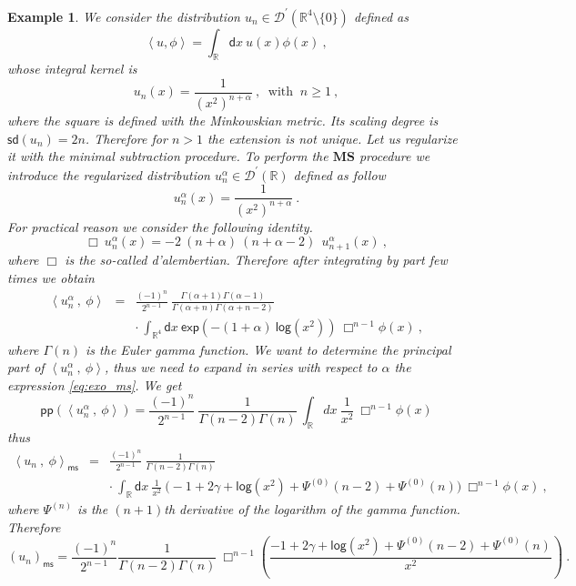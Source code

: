 \documentclass[11pt]{book}
\newcommand{\pp}{\mathsf{pp}}
\newcommand{\ms}{\mathsf{ms}}
\newcommand{\sd}{\mathsf{sd}}
\newcommand{\MS}{\textbf{MS}}
\renewcommand{\exp}{\mathsf{exp}}
\renewcommand{\log}{\mathsf{log}}
\newcommand{\sm}[1]{\left\langle#1\right\rangle}
\newcommand{\Dcal}{\mathcal{D}}
\newcommand{\Rbb}{\mathbb{R}}
\newcommand{\dsf}{\mathsf{d}}
\theoremstyle{break}
\newtheorem{example}{Example}[chapter]
\begin{document}
\begin{example}\label{exo:ms_numeric}
We consider the distribution $u_n \in \Dcal^\prime(\Rbb^4\setminus\{0\})$ defined as 
%
\begin{equation*}
\sm{u, \phi} = \int_{\Rbb} \dsf x \ u(x) \phi(x)  \ ,
\end{equation*}
%
whose integral kernel is 
%
\begin{equation*}
u_n(x) = \frac{1}{(x^2)^{n+\alpha}} \ , \ \mbox{ with } \ n \geq 1 \ ,
\end{equation*}
%
where the square is defined with the Minkowskian metric. Its scaling degree is $\sd(u_n)=2n$. Therefore for $n>1$ the extension is not unique. Let us regularize it with the minimal subtraction procedure. To perform the $\MS$ procedure we introduce the regularized distribution $u^\alpha_n \in \Dcal^\prime(\Rbb)$ defined as follow
%
\begin{equation*}
u^\alpha_n(x) = \frac{1}{(x^2)^{n+\alpha}} \ .
\end{equation*}
%
For practical reason we consider the following identity. 
%
\begin{equation*}
\Box \ u^\alpha_n(x) = - 2 \ (n+\alpha) \ (n+\alpha-2) \ \ u^\alpha_{n+1}(x)  \ , 
\label{eq:relation_exo_ms}
\end{equation*}
%
where $\Box$ is the so-called d'alembertian. Therefore after integrating by part few times we obtain
%
\begin{eqnarray}
\sm{u^\alpha_n \ , \ \phi} &=& \frac{(-1)^{n}}{2^{n-1}} \ \frac{\Gamma(\alpha+1)\Gamma(\alpha-1)}{\Gamma(\alpha+n)\Gamma(\alpha+n-2)} \nonumber \\
&& \cdot \ \int_{\Rbb^4} \dsf x \ \exp\left(-(1+\alpha) \ \log\left(x^2\right)\right) \ \Box^{n-1}\phi(x) \ , 
\label{eq:exo_ms}
\end{eqnarray}
%
where $\Gamma(n)$ is the Euler gamma function. We want to determine the principal part of $\sm{u^\alpha_n \ , \ \phi}$, thus we need to expand in series with respect to $\alpha$ the expression \eqref{eq:exo_ms}. We get
%
\begin{equation*}
\pp\left(\sm{u^\alpha_n \ , \ \phi}\right) = \frac{(-1)^{n}}{2^{n-1}} \ \frac{1}{\Gamma(n-2)\Gamma(n)} \ \int_{\Rbb} dx \ \frac{1}{x^2} \ \Box^{n-1}\phi(x) 
\end{equation*}
%
thus
%
\begin{eqnarray*}
\sm{u_n \ , \ \phi}_\ms &=& \frac{(-1)^{n}}{2^{n-1}} \ \frac{1}{\Gamma(n-2)\Gamma(n)} \\
&& \cdot \ \int_{\Rbb} \dsf x \ \frac{1}{x^2} \ \bigg( -1 + 2 \gamma + \log(x^2) + \Psi^{(0)}(n-2) + \Psi^{(0)}(n) \bigg) \ \Box^{n-1} \phi(x) \ ,
\end{eqnarray*}
%
where $\Psi^{(n)}$ is the $(n+1)$th derivative of the logarithm of the gamma function. Therefore
%
\begin{equation*}
\left(u_n\right)_\ms = \frac{(-1)^{n}}{2^{n-1}} \frac{1}{\Gamma(n-2)\Gamma(n)} \ \Box^{n-1} \left( \frac{-1 + 2 \gamma + \log(x^2) + \Psi^{(0)}(n-2) + \Psi^{(0)}(n)}{x^2} \right) \ .
\end{equation*}
%
\end{example}
\end{document}
